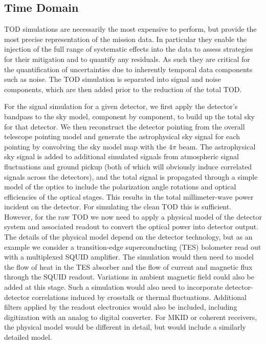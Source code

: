 \subsection{Time Domain}

TOD simulations are necessarily the most expensive to perform, but provide the most precise representation of the mission data. In particular they enable the injection of the full range of systematic effects into the data to assess strategies for their mitigation and to quantify any residuals. As such they are critical for the quantification of uncertainties due to inherently temporal data components such as noise. The TOD simulation is separated into signal and noise components, which are then added prior to the reduction of the total TOD.

For the signal simulation for a given detector, we first apply the detector's bandpass to the sky model, component by component, to build up the total sky for that detector. We then reconstruct the detector pointing from the overall telescope pointing model and generate the astrophysical sky signal for each pointing by convolving the sky model map with the $4 \pi$ beam. The astrophysical sky signal is added to additional simulated signals from atmospheric signal fluctuations and ground pickup (both of which will obviously induce correlated signals across the detectors), and the total signal is propagated through a simple model of the optics to include the polarization angle rotations and optical efficiencies of the optical stages. This results in the total millimeter-wave power incident on the detector. For simulating the clean TOD this is sufficient. However, for the raw TOD we now need to apply a physical model of the detector system and associated readout to convert the optical power into detector output. The details of the physical model depend on the detector technology, but as an example we consider a transition-edge superconducting (TES) bolometer read out with a multiplexed SQUID amplifier. The simulation would then need to model the flow of heat in the TES absorber and the flow of current and magnetic flux through the SQUID readout. Variations in ambient magnetic field could also be added at this stage. Such a simulation would also need to incorporate detector-detector correlations induced by crosstalk or thermal fluctuations.  Additional filters applied by the readout electronics would also be included, including digitization with an analog to digital converter. For MKID or coherent receivers, the physical model would be different in detail, but would include a similarly detailed model.

